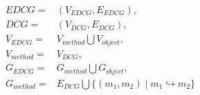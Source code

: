 	\begin{equation}
	\begin{aligned}
	EDCG =              & (V_{EDCG},E_{EDCG}) ,\\ 
	DCG =                & (V_{DCG},E_{DCG}) ,\\ 
	V_{EDCG} =      & V_{method} \bigcup V_{object} ,\\
	V_{method} =   & V_{DCG}, \\ 
	G_{EDCG} =      & G_{method} \bigcup G_{object} , \\
	G_{method} =  & E_{DCG} \bigcup \{ (m_1 , m_2) \mid m_1 \hookrightarrow m_2 \}
	\end{aligned}
	\label{equ:def_edcg} 
	\end{equation}
	

